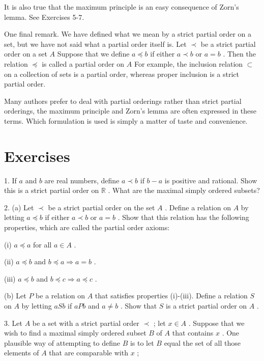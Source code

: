 It is also true that the maximum principle is an easy consequence of Zorn's lemma. See Exercises 5-7.

One final remark. We have defined what we mean by a strict partial order on a set, but we have not said what a partial order itself is. Let \(\prec\) be a strict partial order on a set \(A\) Suppose that we define \(a \preccurlyeq  b\) if either \(a \prec  b\) or \(a = b\) . Then the relation \(\preccurlyeq\) is called a partial order on \(A\) For example, the inclusion relation \(\subset\) on a collection of sets is a partial order, whereas proper inclusion is a strict partial order.

Many authors prefer to deal with partial orderings rather than strict partial orderings, the maximum principle and Zorn's lemma are often expressed in these terms. Which formulation is used is simply a matter of taste and convenience.

\section*{Exercises}

1. If \(a\) and \(b\) are real numbers, define \(a \prec  b\) if \(b - a\) is positive and rational. Show this is a strict partial order on \(\mathbb{R}\) . What are the maximal simply ordered subsets?

2. (a) Let \(\prec\) be a strict partial order on the set \(A\) . Define a relation on \(A\) by letting \(a \preccurlyeq  b\) if either \(a \prec  b\) or \(a = b\) . Show that this relation has the following properties, which are called the partial order axioms:

(i) \(a \preccurlyeq  a\) for all \(a \in  A\) .

(ii) \(a \preccurlyeq  b\) and \(b \preccurlyeq  a \Rightarrow  a = b\) .

(iii) \(a \preccurlyeq  b\) and \(b \preccurlyeq  c \Rightarrow  a \preccurlyeq  c\) .

(b) Let \(P\) be a relation on \(A\) that satisfies properties (i)-(iii). Define a relation \(S\) on \(A\) by letting \({aSb}\) if \({aPb}\) and \(a \neq  b\) . Show that \(S\) is a strict partial order on \(A\) .

3. Let \(A\) be a set with a strict partial order \(\prec\) ; let \(x \in  A\) . Suppose that we wish to find a maximal simply ordered subset \(B\) of \(A\) that contains \(x\) . One plausible way of attempting to define \(B\) is to let \(B\) equal the set of all those elements of \(A\) that are comparable with \(x\) ;


